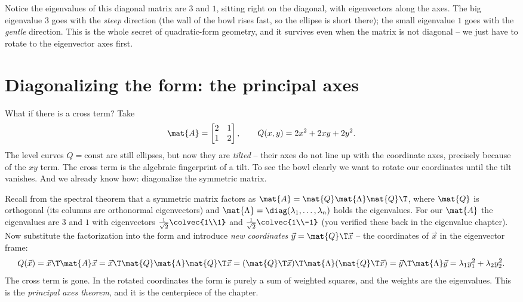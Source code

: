 Notice the eigenvalues of this diagonal matrix are $3$ and $1$, sitting right on the
diagonal, with eigenvectors along the axes. The big eigenvalue $3$ goes with the
\emph{steep} direction (the wall of the bowl rises fast, so the ellipse is short
there); the small eigenvalue $1$ goes with the \emph{gentle} direction. This is the
whole secret of quadratic-form geometry, and it survives even when the matrix is not
diagonal -- we just have to rotate to the eigenvector axes first.

\section{Diagonalizing the form: the principal axes}
\label{ch36:principal-axes}

What if there is a cross term? Take
\[
  \mat{A}=\begin{bmatrix} 2 & 1 \\ 1 & 2 \end{bmatrix},
  \qquad Q(x,y) = 2x^2 + 2xy + 2y^2.
\]
The level curves $Q=\text{const}$ are still ellipses, but now they are \emph{tilted}
-- their axes do not line up with the coordinate axes, precisely because of the $xy$
term. The cross term is the algebraic fingerprint of a tilt. To see the bowl clearly
we want to rotate our coordinates until the tilt vanishes. And we already know how:
diagonalize the symmetric matrix.

Recall from the spectral theorem that a symmetric matrix factors as
$\mat{A}=\mat{Q}\mat{\Lambda}\mat{Q}\T$, where $\mat{Q}$ is orthogonal (its columns
are orthonormal eigenvectors) and $\mat{\Lambda}=\diag(\lambda_1,\dots,\lambda_n)$
holds the eigenvalues. For our $\mat{A}$ the eigenvalues are $3$ and $1$ with
eigenvectors $\tfrac{1}{\sqrt2}\colvec{1\\1}$ and $\tfrac{1}{\sqrt2}\colvec{1\\-1}$
(you verified these back in the eigenvalue chapter). Now substitute the factorization
into the form and introduce \emph{new coordinates} $\vec{y}=\mat{Q}\T\vec{x}$ -- the
coordinates of $\vec{x}$ in the eigenvector frame:
\[
  Q(\vec{x}) = \vec{x}\T\mat{A}\vec{x}
  = \vec{x}\T \mat{Q}\mat{\Lambda}\mat{Q}\T \vec{x}
  = (\mat{Q}\T\vec{x})\T \mat{\Lambda} (\mat{Q}\T\vec{x})
  = \vec{y}\T \mat{\Lambda}\vec{y}
  = \lambda_1 y_1^2 + \lambda_2 y_2^2.
\]
The cross term is gone. In the rotated coordinates the form is purely a sum of
weighted squares, and the weights are the eigenvalues. This is the \emph{principal
axes theorem}, and it is the centerpiece of the chapter.

